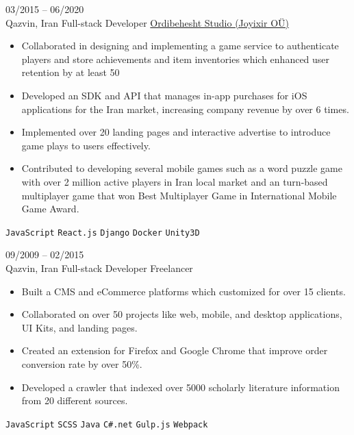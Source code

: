 \documentclass[8pt]{developercv} %
\begin{document}
\begin{entrylist}
        \entry
        {03/2015 -- 06/2020 \\ Qazvin, Iran}
        {Full-stack Developer}
        {\href{https://www.joyixir.com/}{Ordibehesht Studio  (Joyixir OÜ)}}
        {\vspace{-10pt}
            \begin{itemize}[noitemsep,topsep=0pt,parsep=0pt,partopsep=0pt, leftmargin=-1pt]
                \item Collaborated in designing and implementing a game service to authenticate players and store achievements and item inventories which enhanced user retention by at least 50%
                \item Developed an SDK and API that manages in-app purchases for iOS applications for the Iran market, increasing company revenue by over 6 times.
                \item Implemented over 20 landing pages and interactive advertise to introduce game plays to users effectively.
                \item Contributed to developing several mobile games such as a word puzzle game with over 2 million active players in Iran local market and an turn-based multiplayer game that won Best Multiplayer Game in International Mobile Game Award.
            \end{itemize}
            \texttt{JavaScript} \slashsep \texttt{React.js} \slashsep \texttt{Django} \slashsep \texttt{Docker} \slashsep \texttt{Unity3D}
        }

        \entry
        {09/2009 -- 02/2015 \\ Qazvin, Iran}
        {Full-stack Developer}
        {Freelancer}
        {\vspace{-10pt}
            \begin{itemize}[noitemsep,topsep=0pt,parsep=0pt,partopsep=0pt, leftmargin=-1pt]
                \item Built a CMS and eCommerce platforms which customized for over 15 clients.
                \item Collaborated on over 50 projects like web, mobile, and desktop applications, UI Kits, and landing pages.
                \item Created an extension for Firefox and Google Chrome that improve order conversion rate by over 50\%.
                \item Developed a crawler that indexed over 5000 scholarly literature information from 20 different sources.
            \end{itemize}
            \texttt{JavaScript} \slashsep \texttt{SCSS} \slashsep \texttt{Java} \slashsep \texttt{C\#.net} \slashsep \texttt{Gulp.js} \slashsep \texttt{Webpack}
        }
    \end{entrylist}
\end{document}
